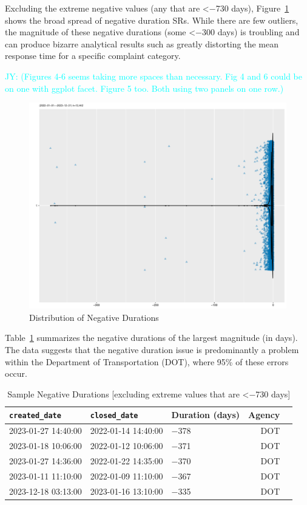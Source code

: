 \documentclass[linenumber]{jdsart}
\newcommand{\jy}[1]{\textcolor{cyan}{JY: (#1)}}
\begin{document}
Excluding the extreme negative values (any that are <$-$730 days), 
Figure~\ref{fig:negative-duration-violin} shows the broad spread of 
negative duration SRs. While there are few outliers, the magnitude 
of these negative durations (some <$-$300 days) is troubling 
and can produce bizarre analytical results such as greatly 
distorting the mean response time for a specific complaint category.

\jy{Figures 4-6 seems taking more spaces than necessary. Fig 4 and 6
  could be on one with ggplot facet. Figure 5 too. Both using two
  panels on one row.}

\begin{figure}[tbp]
	 \centering
 	 \includegraphics[width=\textwidth]{negative_duration_SR_violin.pdf}
 \caption{Distribution of Negative Durations}
 \label{fig:negative-duration-violin}
\end{figure}

Table~\ref{tab:largest-errors} summarizes the 
negative durations of the largest magnitude (in days). The data 
suggests that the negative duration issue is predominantly a problem 
within the Department of Transportation (DOT), where 95\% of these 
errors occur.

\begin{table}[tbp]
  \centering
  \caption{Sample  Negative Durations [excluding extreme values that are <$-$730 days]}
   \label{tab:largest-errors}
 	\begin{tabular}{l l l r l}
    \toprule
    \texttt{created\_date} & \texttt{closed\_date} & {Duration (days)}  & {Agency} \\
    \midrule
    2023-01-27 14:40:00 & 2022-01-14 14:40:00 & $-$378 & DOT \\
    2023-01-18 10:06:00 & 2022-01-12 10:06:00 & $-$371 & DOT \\
    2023-01-27 14:36:00 & 2022-01-22 14:35:00 & $-$370 & DOT \\
    2023-01-11 11:10:00 & 2022-01-09 11:10:00 & $-$367 & DOT \\
    2023-12-18 03:13:00 & 2023-01-16 13:10:00 & $-$335 & DOT \\
    \bottomrule
    \end{tabular}
 \end{table}
\end{document}
